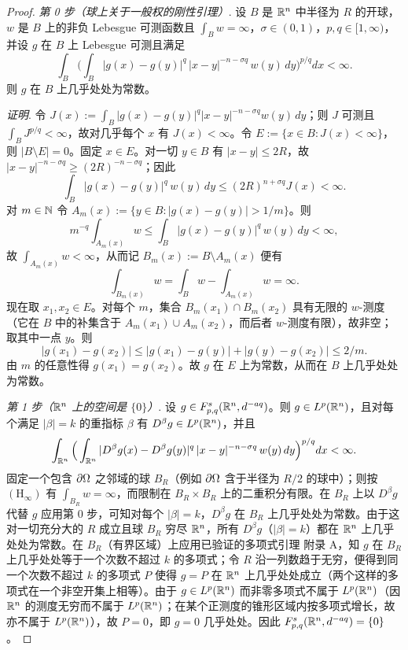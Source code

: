\begin{proof}
\emph{第 0 步（球上关于一般权的刚性引理）}. 设 $B$ 是 $\mathbb{R}^n$ 中半径为 $R$ 的开球，$w$ 是 $B$ 上的非负 Lebesgue 可测函数且 $\int_B w=\infty$，$\sigma\in(0,1)$，$p,q\in[1,\infty)$，并设 $g$ 在 $B$ 上 Lebesgue 可测且满足
\[
  \int_B\Big(\int_B|g(x)-g(y)|^q\,|x-y|^{-n-\sigma q}\,w(y)\,dy\Big)^{p/q}dx<\infty.
\]
则 $g$ 在 $B$ 上几乎处处为常数。

\emph{证明}. 令 $J(x):=\int_B|g(x)-g(y)|^q|x-y|^{-n-\sigma q}w(y)\,dy$；则 $J$ 可测且 $\int_B J^{p/q}<\infty$，故对几乎每个 $x$ 有 $J(x)<\infty$。令 $E:=\{x\in B:J(x)<\infty\}$，则 $|B\setminus E|=0$。固定 $x\in E$。对一切 $y\in B$ 有 $|x-y|\le2R$，故 $|x-y|^{-n-\sigma q}\ge(2R)^{-n-\sigma q}$；因此
\[
  \int_B|g(x)-g(y)|^q\,w(y)\,dy\le(2R)^{n+\sigma q}J(x)<\infty.
\]
对 $m\in\mathbb{N}$ 令 $A_m(x):=\{y\in B:|g(x)-g(y)|>1/m\}$。则
\[
  m^{-q}\int_{A_m(x)}w\le\int_B|g(x)-g(y)|^q\,w(y)\,dy<\infty,
\]
故 $\int_{A_m(x)}w<\infty$，从而记 $B_m(x):=B\setminus A_m(x)$ 便有
\[
  \int_{B_m(x)}w=\int_B w-\int_{A_m(x)}w=\infty.
\]
现在取 $x_1,x_2\in E$。对每个 $m$，集合 $B_m(x_1)\cap B_m(x_2)$ 具有无限的 $w$-测度（它在 $B$ 中的补集含于 $A_m(x_1)\cup A_m(x_2)$，而后者 $w$-测度有限），故非空；取其中一点 $y$。则
\[
  |g(x_1)-g(x_2)|\le|g(x_1)-g(y)|+|g(y)-g(x_2)|\le2/m.
\]
由 $m$ 的任意性得 $g(x_1)=g(x_2)$。故 $g$ 在 $E$ 上为常数，从而在 $B$ 上几乎处处为常数。

\emph{第 1 步（$\mathbb{R}^n$ 上的空间是 $\{0\}$）}. 设 $g\in F^{s}_{p,q}(\mathbb{R}^n,d^{-aq})$。则 $g\in L^p(\mathbb{R}^n)$，且对每个满足 $|\beta|=k$ 的重指标 $\beta$ 有 $D^\beta g\in L^p(\mathbb{R}^n)$，并且
\[
  \int_{\mathbb{R}^n}\Big(\int_{\mathbb{R}^n}|D^\beta g(x)-D^\beta g(y)|^q\,|x-y|^{-n-\sigma q}\,w(y)\,dy\Big)^{p/q}dx<\infty.
\]
固定一个包含 $\partial\Omega$ 之邻域的球 $B_R$（例如 $\partial\Omega$ 含于半径为 $R/2$ 的球中）；则按 $\mathrm{(H_{\infty})}$ 有 $\int_{B_R}w=\infty$，而限制在 $B_R\times B_R$ 上的二重积分有限。在 $B_R$ 上以 $D^\beta g$ 代替 $g$ 应用第 0 步，可知对每个 $|\beta|=k$，$D^\beta g$ 在 $B_R$ 上几乎处处为常数。由于这对一切充分大的 $R$ 成立且球 $B_R$ 穷尽 $\mathbb{R}^n$，所有 $D^\beta g$（$|\beta|=k$）都在 $\mathbb{R}^n$ 上几乎处处为常数。在 $B_R$（有界区域）上应用已验证的多项式引理 附录 A，知 $g$ 在 $B_R$ 上几乎处处等于一个次数不超过 $k$ 的多项式；令 $R$ 沿一列数趋于无穷，便得到同一个次数不超过 $k$ 的多项式 $P$ 使得 $g=P$ 在 $\mathbb{R}^n$ 上几乎处处成立（两个这样的多项式在一个非空开集上相等）。由于 $g\in L^p(\mathbb{R}^n)$ 而非零多项式不属于 $L^p(\mathbb{R}^n)$（因 $\mathbb{R}^n$ 的测度无穷而不属于 $L^p(\mathbb{R}^n)$；在某个正测度的锥形区域内按多项式增长，故亦不属于 $L^p(\mathbb{R}^n)$），故 $P=0$，即 $g=0$ 几乎处处。因此 $F^{s}_{p,q}(\mathbb{R}^n,d^{-aq})=\{0\}$。


\end{proof}
